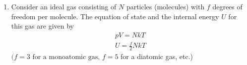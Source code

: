 \documentclass[10pt]{article}
\newenvironment{Solution}
    {\textbf{Solution:}
    
    \vspace{5mm}
    \begin{tcolorbox}
    }
    {
    \end{tcolorbox}
    \vspace{5mm}
    }
\begin{document}
\begin{enumerate}
\begin{enumerate}
    \begin{Solution}
    \begin{align}
        S(T, x) &= \int \left.\frac{\partial S}{\partial T}\right|_x dT + \int \left.\frac{\partial S}{\partial x}\right|_T dx + S_0\\
        &= \int A dT + \int (b-cx) dx + S_0
    \end{align}
    So, 
    \begin{equation}
        \boxed{S(T,x) = AT + bx - \frac{1}{2}c x^2 + S_0}
    \end{equation}
    
    \end{Solution}
    \item Calculate the heat capacity at constant tension, that is,
$$
C_{\tau}=T\left(\frac{\partial S}{\partial T}\right)_{\tau}
$$
as a function of $T$ and $\tau$
    
    \begin{Solution}

    \begin{equation}
    \left.\frac{\partial S}{\partial T}\right|_{\tau}=\left.\frac{\partial S}{\partial T}\right|_{x}+\left.\frac{\partial S}{\partial x}\right|_{T} \left.\frac{\partial x}{\partial T}\right|_{\tau}
    \end{equation}
    
    \begin{equation}
        \left.\frac{\partial S}{\partial T}\right|_{x} = A_0 \qquad \left.\frac{\partial S}{\partial x}\right|_T = b - c x \qquad \left.\frac{\partial x}{\partial T}\right|_{\tau} = \frac{b a -\tau c}{\left(a + c T\right)^2}
    \end{equation}
    
    \begin{equation}
        \left.\frac{\partial S}{\partial T}\right|_{\tau} = A_0 + \left(b - c x\right)\frac{b a -\tau c}{\left(a + c T\right)^2}
    \end{equation}
    \begin{equation}
        \boxed{C_{\tau} = TA_0 + T\left(b - c x\right)\frac{b a -\tau c}{\left(a + c T\right)^2}}
    \end{equation}
    \end{Solution}

\end{enumerate}
\newpage

\item Consider an ideal gas consisting of $N$ particles (molecules) with $f$ degrees of freedom per molecule. The equation of state and the internal energy $U$ for this gas are given by
$$
\begin{array}{l}
p V=N k T \\
U=\frac{f}{2} N k T
\end{array}
$$
$(f=3 \text { for a monoatomic gas, } f=5$ for a diatomic gas, etc.)



\end{enumerate}
\end{document}
